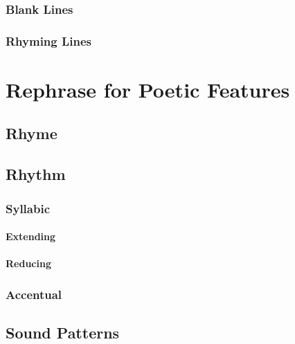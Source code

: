 \subsubsection{Blank Lines}
\subsubsection{Rhyming Lines}


\section{Rephrase for Poetic Features}

\subsection{Rhyme}


\subsection{Rhythm}

\subsubsection{Syllabic}
\paragraph{Extending}
\paragraph{Reducing}

\subsubsection{Accentual}


\subsection{Sound Patterns}




